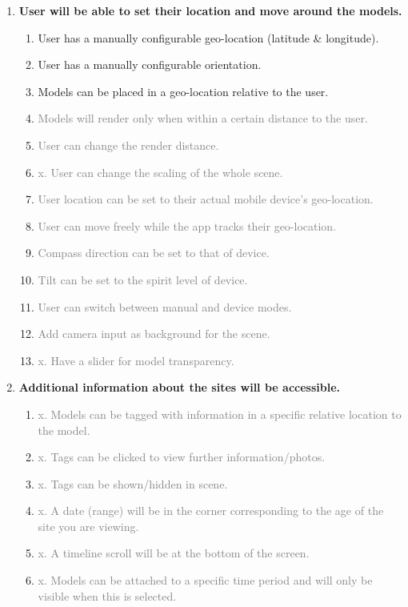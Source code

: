 \documentclass{article}
\newcommand{\light}[1]{\textcolor{gray}{#1}}
\begin{document}
\begin{enumerate}[label=(\Alph*)]
\item \textbf{User will be able to set their location and move around the models.}
    \begin{enumerate}[label=\arabic*.]
    \item User has a manually configurable geo-location (latitude \& longitude).
    \item User has a manually configurable orientation.
    \item Models can be placed in a geo-location relative to the user.
    \item \light{Models will render only when within a certain distance to the user.}
    \item \light{User can change the render distance.}
    \item \light{x. User can change the scaling of the whole scene.}
    \item \light{User location can be set to their actual mobile device's geo-location.}
    \item \light{User can move freely while the app tracks their geo-location.}
    \item \light{Compass direction can be set to that of device.}
    \item \light{Tilt can be set to the spirit level of device.}
    \item \light{User can switch between manual and device modes.}
    \item \light{Add camera input as background for the scene.}
    \item \light{x. Have a slider for model transparency.}
    \end{enumerate}
    
\item \textbf{Additional information about the sites will be accessible.}
    \begin{enumerate}[label=\arabic*.]
    \item \light{x. Models can be tagged with information in a specific relative location to the model.}
    \item \light{x. Tags can be clicked to view further information/photos.}
    \item \light{x. Tags can be shown/hidden in scene.}
    \item \light{x. A date (range) will be in the corner corresponding to the age of the site you are viewing.}
    \item \light{x. A timeline scroll will be at the bottom of the screen.}
    \item \light{x. Models can be attached to a specific time period and will only be visible when this is selected.}
    \end{enumerate}


\end{enumerate}
\end{document}
